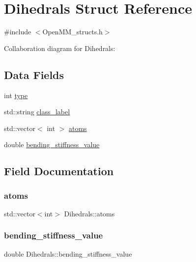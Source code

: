 \hypertarget{structDihedrals}{}\section{Dihedrals Struct Reference}
\label{structDihedrals}


{\ttfamily \#include $<$Open\+M\+M\+\_\+structs.\+h$>$}



Collaboration diagram for Dihedrals\+:
\subsection*{Data Fields}
\begin{DoxyCompactItemize}
\item 
int \mbox{\hyperlink{structDihedrals_aec015ae7812fd13d61a9ff90645c104b}{type}}
\item 
std\+::string \mbox{\hyperlink{structDihedrals_a43e78eca1517f607d420ddc3387adc42}{class\+\_\+label}}
\item 
std\+::vector$<$ int $>$ \mbox{\hyperlink{structDihedrals_a725d2759bee181eede7152172a55ca9f}{atoms}}
\item 
double \mbox{\hyperlink{structDihedrals_aadecae129e161803f43e86d153466b61}{bending\+\_\+stiffness\+\_\+value}}
\end{DoxyCompactItemize}


\subsection{Field Documentation}
\mbox{\label{structDihedrals_a725d2759bee181eede7152172a55ca9f}} 
\subsubsection{\texorpdfstring{atoms}{atoms}}
{\footnotesize\ttfamily std\+::vector$<$int$>$ Dihedrals\+::atoms}

\mbox{\label{structDihedrals_aadecae129e161803f43e86d153466b61}} 
\subsubsection{\texorpdfstring{bending\_stiffness\_value}{bending\_stiffness\_value}}
{\footnotesize\ttfamily double Dihedrals\+::bending\+\_\+stiffness\+\_\+value}

